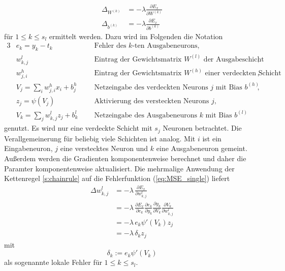 \begin{align*}
    \Delta_{W^{(k)}} &= -\lambda \frac{\partial E_x}{\partial W^{(k)}} \\
    \Delta_{b^{(k)}} &= -\lambda \frac{\partial E_x}{\partial b^{(k)}} 
\end{align*}
für $1 \leq k \leq s_l$ ermittelt werden. Dazu wird im Folgenden die Notation \cite{du_diss}
\begin{alignat*}{3}
    &e_k=y_k-t_k &&\text{Fehler des $k$-ten Ausgabeneurons},  \\
    &w_{k,j}^l  &&\text{Eintrag der Gewichtsmatrix $W^{(l)}$ der Ausgabeschicht}, \\
    &w_{j,i}^h   &&\text{Eintrag der Gewichtsmatrix $W^{(h)}$ einer verdeckten Schicht}, \\
    &V_j=\sum_{i} w_{j,i}^h x_i +b^h_j \; \; \;  &&\text{Netzeingabe des verdeckten Neurons $j$ mit Bias $b^{(h)}$}, \\
    &z_{j}= \psi \left(V_j\right) &&\text{Aktivierung des versteckten Neurons $j$},\\
    &V_k=\sum_{j} w_{k,j}^l z_j +b^l_k&&\text{Netzeingabe des Ausgabeneurons $k$ mit Bias $b^{(l)}$}  
\end{alignat*}
genutzt. Es wird nur eine verdeckte Schicht mit $s_j$ Neuronen betrachtet. Die Verallgemeinerung für beliebig viele Schichten ist analog. Mit $i$ ist ein Eingabeneuron, $j$ eine verstecktes Neuron und $k$ eine Ausgabeneuron gemeint. Außerdem werden die Gradienten komponentenweise berechnet und daher die Paramter komponentenweise aktualisiert. Die mehrmalige Anwendung der Kettenregel \ref{s:chainrule} auf die Fehlerfunktion (\ref{eq:MSE_single}) liefert
\begin{align*}
    \label{eq:delta_w_out}
\Delta w_{k,j}^l &= -\lambda\,\frac{\partial E_x}{\partial w_{k,j}^l} \\
                 &= -\lambda\,\frac{\partial E_x}{\partial e_{k}}
                            \frac{\partial e_k}{\partial y_k} 
                            \frac{\partial y_k}{\partial V_k}
                            \frac{\partial V_k}{\partial w_{k,j}^l}\\
                 &= -\lambda \,e_k \psi'(V_k) z_j \\
                 &= -\lambda \,\delta_k z_j           
\end{align*} 
mit 
\begin{equation}
    \label{eq:delta_out}
    \delta_k:= e_k \psi'(V_k)
\end{equation}
als sogenannte lokale Fehler für $1 \leq k \leq s_l$.
